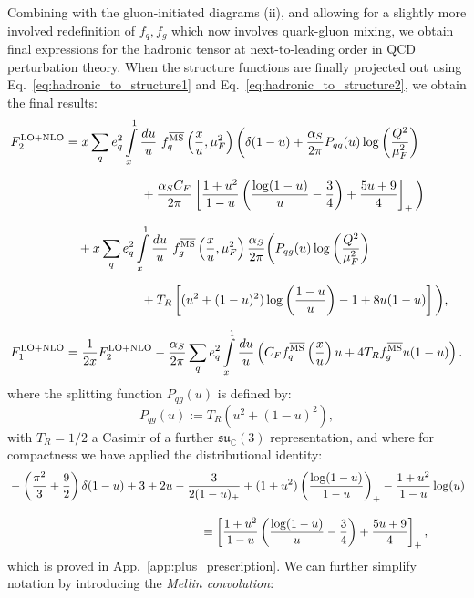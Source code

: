 \documentclass[withindex,glossary]{cam-thesis}
\begin{document}
\noindent Combining with the gluon-initiated diagrams (ii), and allowing for a slightly more involved redefinition of $f_q, f_g$ which now involves quark-gluon mixing, we obtain final expressions for the hadronic tensor at next-to-leading order in QCD perturbation theory. When the structure functions are finally projected out using Eq.~\eqref{eq:hadronic_to_structure1} and Eq.~\eqref{eq:hadronic_to_structure2}, we obtain the final results:
\begin{align}
F_2^{\text{LO+NLO}} &= x \sum_{q} e_q^2 \int\limits_{x}^{1} \frac{du}{u}\ f^{\overline{\text{MS}}}_q\left(\frac{x}{u},\mu_F^2\right)   \bigg( \delta(1-u) + \frac{\alpha_S}{2\pi} P_{qq}(u) \log\left( \frac{Q^2}{\mu_F^2} \right) \notag\\[1.5ex]
&\qquad\qquad\qquad + \frac{\alpha_S C_F}{2\pi} \left[ \frac{1+u^2}{1-u} \left( \frac{\log(1-u)}{u} - \frac{3}{4} \right) + \frac{5u + 9}{4}\right]_+\bigg) \notag \\[1.5ex]
&\quad + x \sum_{q} e_q^2 \int\limits_{x}^{1} \frac{du}{u}\ f^{\overline{\text{MS}}}_g\left( \frac{x}{u}, \mu_F^2\right) \frac{\alpha_S}{2\pi} \bigg( P_{qg}(u) \log\left( \frac{Q^2}{\mu_F^2}\right) \notag \\[1.5ex]
&\qquad\qquad\qquad + T_R \left[ (u^2 + (1-u)^2) \log\left( \frac{1-u}{u} \right) - 1 + 8u(1-u)\right] \bigg),\\[1.5ex]
F_1^{\text{LO+NLO}} &= \frac{1}{2x} F_2^{\text{LO+NLO}} - \frac{\alpha_S}{2\pi} \sum_{q} e_q^2 \int\limits_{x}^{1} \frac{du}{u} \left( C_F f_q^{\overline{\text{MS}}}\left( \frac{x}{u} \right) u + 4T_R f_g^{\overline{\text{MS}}} u(1-u) \right).
\end{align}
where the splitting function $P_{qg}(u)$ is defined by:
\begin{equation}
P_{qg}(u) := T_R ( u^2 + (1-u)^2 ),
\end{equation}
with $T_R=1/2$ a Casimir of a further $\mathfrak{su}_\mathbb{C}(3)$ representation, and where for compactness we have applied the distributional identity:
\begin{align}
&-\left( \frac{\pi^2}{3} + \frac{9}{2} \right) \delta(1-u) + 3 + 2u - \frac{3}{2(1-u)_+} + (1+u^2) \left( \frac{\log(1-u)}{1-u} \right)_+ - \frac{1+u^2}{1-u} \log(u)\notag \\[2ex]
&\qquad\qquad\qquad\qquad\qquad\qquad\qquad\qquad \equiv \left[ \frac{1+u^2}{1-u} \left( \frac{\log(1-u)}{u} - \frac{3}{4} \right) + \frac{5u + 9}{4}\right]_+,
\end{align}
which is proved in App.~\ref{app:plus_prescription}. We can further simplify notation by introducing the \textit{Mellin convolution}:
\end{document}
